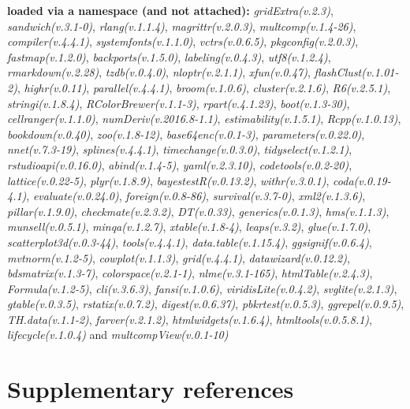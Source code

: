\documentclass[
  bookmarksnumbered]{article}
\begin{document}
\textbf{loaded via a namespace (and not attached):}
\emph{gridExtra(v.2.3)}, \emph{sandwich(v.3.1-0)}, \emph{rlang(v.1.1.4)}, \emph{magrittr(v.2.0.3)}, \emph{multcomp(v.1.4-26)}, \emph{compiler(v.4.4.1)}, \emph{systemfonts(v.1.1.0)}, \emph{vctrs(v.0.6.5)}, \emph{pkgconfig(v.2.0.3)}, \emph{fastmap(v.1.2.0)}, \emph{backports(v.1.5.0)}, \emph{labeling(v.0.4.3)}, \emph{utf8(v.1.2.4)}, \emph{rmarkdown(v.2.28)}, \emph{tzdb(v.0.4.0)}, \emph{nloptr(v.2.1.1)}, \emph{xfun(v.0.47)}, \emph{flashClust(v.1.01-2)}, \emph{highr(v.0.11)}, \emph{parallel(v.4.4.1)}, \emph{broom(v.1.0.6)}, \emph{cluster(v.2.1.6)}, \emph{R6(v.2.5.1)}, \emph{stringi(v.1.8.4)}, \emph{RColorBrewer(v.1.1-3)}, \emph{rpart(v.4.1.23)}, \emph{boot(v.1.3-30)}, \emph{cellranger(v.1.1.0)}, \emph{numDeriv(v.2016.8-1.1)}, \emph{estimability(v.1.5.1)}, \emph{Rcpp(v.1.0.13)}, \emph{bookdown(v.0.40)}, \emph{zoo(v.1.8-12)}, \emph{base64enc(v.0.1-3)}, \emph{parameters(v.0.22.0)}, \emph{nnet(v.7.3-19)}, \emph{splines(v.4.4.1)}, \emph{timechange(v.0.3.0)}, \emph{tidyselect(v.1.2.1)}, \emph{rstudioapi(v.0.16.0)}, \emph{abind(v.1.4-5)}, \emph{yaml(v.2.3.10)}, \emph{codetools(v.0.2-20)}, \emph{lattice(v.0.22-5)}, \emph{plyr(v.1.8.9)}, \emph{bayestestR(v.0.13.2)}, \emph{withr(v.3.0.1)}, \emph{coda(v.0.19-4.1)}, \emph{evaluate(v.0.24.0)}, \emph{foreign(v.0.8-86)}, \emph{survival(v.3.7-0)}, \emph{xml2(v.1.3.6)}, \emph{pillar(v.1.9.0)}, \emph{checkmate(v.2.3.2)}, \emph{DT(v.0.33)}, \emph{generics(v.0.1.3)}, \emph{hms(v.1.1.3)}, \emph{munsell(v.0.5.1)}, \emph{minqa(v.1.2.7)}, \emph{xtable(v.1.8-4)}, \emph{leaps(v.3.2)}, \emph{glue(v.1.7.0)}, \emph{scatterplot3d(v.0.3-44)}, \emph{tools(v.4.4.1)}, \emph{data.table(v.1.15.4)}, \emph{ggsignif(v.0.6.4)}, \emph{mvtnorm(v.1.2-5)}, \emph{cowplot(v.1.1.3)}, \emph{grid(v.4.4.1)}, \emph{datawizard(v.0.12.2)}, \emph{bdsmatrix(v.1.3-7)}, \emph{colorspace(v.2.1-1)}, \emph{nlme(v.3.1-165)}, \emph{htmlTable(v.2.4.3)}, \emph{Formula(v.1.2-5)}, \emph{cli(v.3.6.3)}, \emph{fansi(v.1.0.6)}, \emph{viridisLite(v.0.4.2)}, \emph{svglite(v.2.1.3)}, \emph{gtable(v.0.3.5)}, \emph{rstatix(v.0.7.2)}, \emph{digest(v.0.6.37)}, \emph{pbkrtest(v.0.5.3)}, \emph{ggrepel(v.0.9.5)}, \emph{TH.data(v.1.1-2)}, \emph{farver(v.2.1.2)}, \emph{htmlwidgets(v.1.6.4)}, \emph{htmltools(v.0.5.8.1)}, \emph{lifecycle(v.1.0.4)} and \emph{multcompView(v.0.1-10)}

\section{Supplementary references}\label{refs}

\begin{multicols}{2}
\AtNextBibliography{\footnotesize}
\printbibliography[heading=none]
\normalsize
\end{multicols}

\def\printbibliography{}

\printbibliography
\end{document}
